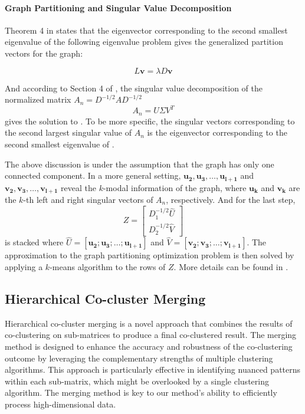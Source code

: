 \paragraph{Graph Partitioning and Singular Value Decomposition}
Theorem 4 in \cite{dhillon2001CoclusteringDocumentsWords} states that the eigenvector corresponding to the second smallest eigenvalue of the following eigenvalue problem gives the generalized partition vectors for the graph:

\begin{equation}
    L \mathbf{v} = \lambda D \mathbf{v}
    \label{eq:eigenvalue_problem}
\end{equation}

And according to Section 4 of \cite{dhillon2001CoclusteringDocumentsWords}, the singular value decomposition of the normalized matrix $A_n = D^{-1/2} A D^{-1/2}$
$$A_n = U \Sigma V^T$$
gives the solution to . To be more specific, the singular vectors corresponding to the second largest singular value of $A_n$ is the eigenvector corresponding to the second smallest eigenvalue of .

The above discussion is under the assumption that the graph has only one connected component. In a more general setting, $\mathbf{u_2}, \mathbf{u_3}, \ldots, \mathbf{u_{l+1}}$ and $\mathbf{v_2}, \mathbf{v_3}, \ldots, \mathbf{v_{l+1}}$ reveal the $k$-modal information of the graph, where $\mathbf{u_k}$ and $\mathbf{v_k}$ are the $k$-th left and right singular vectors of $A_n$, respectively.
And for the last step,
$$ Z = \begin{bmatrix} D_1^{-1/2} \hat{U} \\ D_2^{-1/2} \hat{V} \end{bmatrix} $$
is stacked where $\hat{U} = [\mathbf{u_2}; \mathbf{u_3}; \ldots; \mathbf{u_{l+1}}]$ and $\hat{V} = [\mathbf{v_2}; \mathbf{v_3}; \ldots; \mathbf{v_{l+1}}]$. The approximation to the graph partitioning optimization problem is then solved by applying a $k$-means algorithm to the rows of $Z$. More details can be found in \cite{dhillon2001CoclusteringDocumentsWords}.

\subsection{Hierarchical Co-cluster Merging}

Hierarchical co-cluster merging is a novel approach that combines the results of co-clustering on sub-matrices to produce a final co-clustered result.
The merging method is designed to enhance the accuracy and robustness of the co-clustering outcome by leveraging the complementary strengths of multiple clustering algorithms. This approach is particularly effective in identifying nuanced patterns within each sub-matrix, which might be overlooked by a single clustering algorithm. The merging method is key to our method's ability to efficiently process high-dimensional data.

